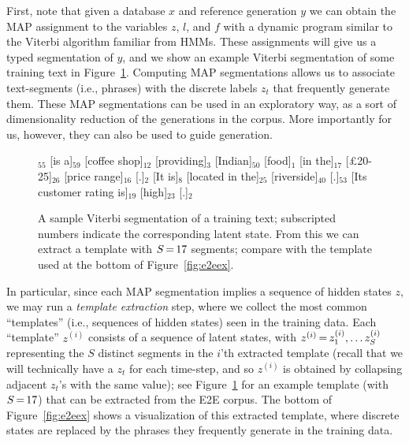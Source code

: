 \documentclass[11pt,a4paper]{article}
\begin{document}
First, note that given a database $x$ and reference generation $y$ we can obtain the MAP assignment to the variables $z$, $l$, and $f$ with a dynamic program similar to the Viterbi algorithm familiar from HMMs. These assignments will give us a typed segmentation of $y$, and we show an example Viterbi segmentation of some training text in Figure~\ref{fig:segmentation}. Computing MAP segmentations allows us to associate text-segments (i.e., phrases) with the discrete labels $z_t$ that frequently generate them. These MAP segmentations can be used in an exploratory way, as a sort of dimensionality reduction of the generations in the corpus. More importantly for us, however, they can also be used to guide generation.


\begin{figure}[t!]
    [The Golden Palace]$_{55}$ [is a]$_{59}$ [coffee shop]$_{12}$ [providing]$_{3}$ [Indian]$_{50}$ [food]$_{1}$ [in the]$_{17}$ [\pounds 20-25]$_{26}$ [price range]$_{16}$ [.]$_{2}$ [It is]$_{8}$ [located in the]$_{25}$ [riverside]$_{40}$ [.]$_{53}$ [Its customer rating is]$_{19}$ [high]$_{23}$ [.]$_{2}$
    \caption{A sample Viterbi segmentation of a training text; subscripted numbers indicate the corresponding latent state. From this we can extract a template with $S \, {=} \, 17$ segments; compare with the template used at the bottom  of Figure~\ref{fig:e2eex}. }
    \label{fig:segmentation}
\end{figure}

In particular, since each MAP segmentation implies a sequence of hidden states $z$, we may run a \textit{template extraction} step, where we collect the most common ``templates'' (i.e., sequences of hidden states) seen in the training data. Each ``template'' $z^{(i)}$ consists of a sequence of latent states, with $z^{(i)} \, {=} \, z^{(i)}_1, \ldots z^{(i)}_S$ representing the $S$ distinct segments in the $i$'th extracted template (recall that we will technically have a $z_t$ for each time-step, and so $z^{(i)}$ is obtained by collapsing adjacent $z_t$'s with the same value); see Figure~\ref{fig:segmentation} for an example template (with $S \, {=} \, 17$) that can be extracted from the E2E corpus. The bottom of Figure~\ref{fig:e2eex} shows a visualization of this extracted template, where discrete states are replaced by the phrases they frequently generate in the training data.
\end{document}
